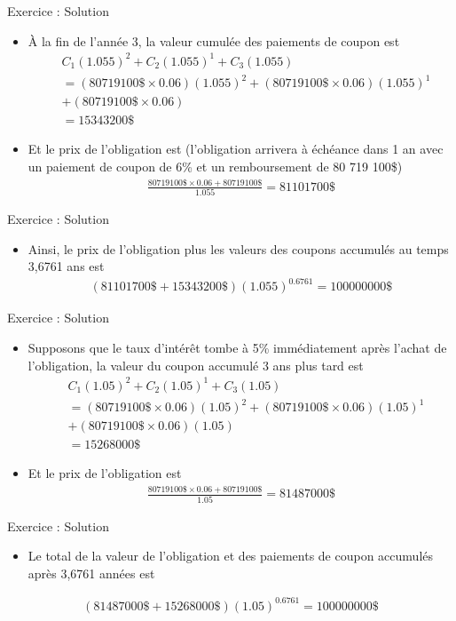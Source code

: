 \documentclass{beamer}
\begin{document}
\begin{frame}{Exercice : Solution}
\begin{itemize}[label=\bullet]
\item À la fin de l'année 3, la valeur cumulée des paiements de coupon est
\begin{align*}
&C_1 (1.055)^2+C_2 (1.055)^1+C_3 (1.055) \\
&= (80 719 100\$ \times 0.06)(1.055)^2+(80 719 100\$ \times 0.06)(1.055)^1\\
&+(80 719 100\$ \times 0.06) \\
&= 15 343 200 \$
\end{align*}
\item Et le prix de l'obligation est (l'obligation arrivera à échéance dans 1 an avec un paiement de coupon de 6\% et un remboursement de 80 719 100\$)
\begin{align*}
\frac{80 719 100\$ \times 0.06+80 719 100\$}{1.055}=81 101 700 \$
\end{align*}
\end{itemize}
\end{frame}


\begin{frame}{Exercice : Solution}
\begin{itemize}[label=\bullet]
\item Ainsi, le prix de l'obligation plus les valeurs des coupons accumulés au temps 3,6761 ans est
\begin{align*}
(81 101 700 \$+15 343 200 \$)(1.055)^{0.6761}=100 000 000\$
\end{align*}
\end{itemize}
\end{frame}

\begin{frame}{Exercice : Solution}
\begin{itemize}[label=\bullet]
\item Supposons que le taux d'intérêt tombe à 5\% immédiatement après l'achat de l'obligation, la valeur du coupon accumulé 3 ans plus tard est
\begin{align*}
&C_1 (1.05)^2+C_2 (1.05)^1+C_3 (1.05) \\
&= (80 719 100\$ \times 0.06)(1.05)^2+(80 719 100\$ \times 0.06)(1.05)^1\\
&+(80 719 100\$ \times 0.06)(1.05) \\
&= 15 268 000 \$
\end{align*}
\item Et le prix de l'obligation est
\begin{align*}
\frac{80 719 100\$ \times 0.06+80 719 100\$}{1.05}=81 487 000 \$
\end{align*}
\end{itemize}
\end{frame}

\begin{frame}{Exercice : Solution}
\begin{itemize}[label=\bullet]
\item Le total de la valeur de l'obligation et des paiements de coupon accumulés après 3,6761 années est
\end{itemize}
\begin{align*}
(81 487 000 \$+15 268 000 \$)(1.05)^{0.6761}=100 000 000\$
\end{align*}
\end{frame}
\end{document}

